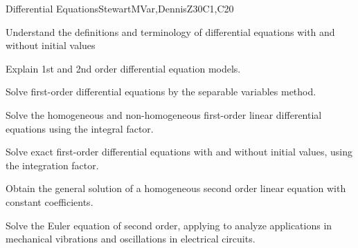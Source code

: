 \begin{syllabus}
\begin{unit}{Differential Equations}{}{StewartMVar,DennisZ}{30}{C1,C20}
   \begin{learningoutcomes}
    \item Understand the definitions and terminology of differential equations with and without initial values
    \item Explain 1st and 2nd order differential equation models.
    \item Solve first-order differential equations by the separable variables method.
    \item Solve the homogeneous and non-homogeneous first-order linear differential equations using the integral factor.
    \item Solve exact first-order differential equations with and without initial values, using the integration factor.
    \item Obtain the general solution of a homogeneous second order linear equation with constant coefficients.
    \item Solve the Euler equation of second order, applying to analyze applications in mechanical vibrations and oscillations in electrical circuits.
   \end{learningoutcomes}
\end{unit}

\begin{coursebibliography}
\end{coursebibliography}

\end{syllabus}
